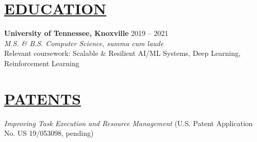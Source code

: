 \documentclass[overlapped,line,11pt]{res}
\begin{document}
\begin{resume}
\section{\underline{EDUCATION}}
\vspace{4pt}
\textbf{University of Tennessee, Knoxville} \hfill 2019 – 2021 \\
{\sl M.S. \& B.S. Computer Science, summa cum laude} \\
Relevant coursework: Scalable \& Resilient AI/ML Systems, Deep Learning, Reinforcement Learning

\section{\underline{PATENTS}}
\vspace{4pt}
{\sl Improving Task Execution and Resource Management} (U.S. Patent Application No. US 19/053098, pending)

\end{resume}
\end{document}
